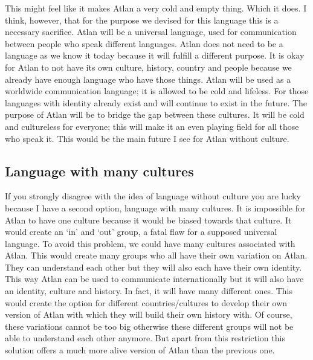 This might feel like it makes Atlan a very cold and empty thing. Which it does. I think, however, that for the purpose we devised for this language this is a necessary sacrifice. Atlan will be a universal language, used for communication between people who speak different languages. Atlan does not need to be a language as we know it today because it will fulfill a different purpose. It is okay for Atlan to not have its own culture, history, country and people because we already have enough language who have those things. Atlan will be used as a worldwide communication language; it is allowed to be cold and lifeless. For those languages with identity already exist and will continue to exist in the future. The purpose of Atlan will be to bridge the gap between these cultures. It will be cold and cultureless for everyone; this will make it an even playing field for all those who speak it. This would be the main future I see for Atlan without culture.  

\vspace{-3cm}
\subsection{Language with many cultures} 

If you strongly disagree with the idea of language without culture you are lucky because I have a second option, language with many cultures. It is impossible for Atlan to have one culture because it would be biased towards that culture. It would create an ‘in’ and ‘out’ group, a fatal flaw for a supposed universal language. To avoid this problem, we could have many cultures associated with Atlan. This would create many groups who all have their own variation on Atlan. They can understand each other but they will also each have their own identity. This way Atlan can be used to communicate internationally but it will also have an identity, culture and history. In fact, it will have many different ones. This would create the option for different countries/cultures to develop their own version of Atlan with which they will build their own history with. Of course, these variations cannot be too big otherwise these different groups will not be able to understand each other anymore. But apart from this restriction this solution offers a much more alive version of Atlan than the previous one.  

